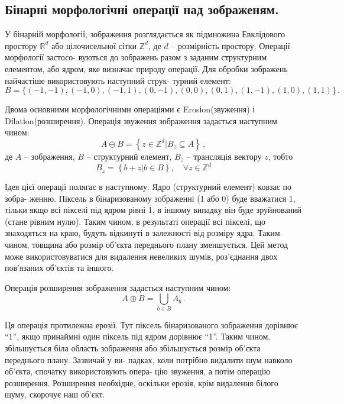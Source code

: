 \subsection{Бінарні морфологічні операції над зображеням.}

У бінарній морфології, зображення розглядається як підмножина Евклідового простору \(\mathbb{R}^d\) або цілочисельної сітки \(\mathbb{Z}^d\), де \(d\) -- розмірність простору. Операції морфології застосо- вуються до зображень разом з заданим структурним елементом, або ядром, яке визначає природу операції. Для обробки зображень найчастіше використовують наступний струк- турний елемент:
\begin{equation*}
B = \{ (-1, -1), (-1, 0), (-1, 1), (0, -1), (0, 0), (0, 1), (1, -1), (1, 0), (1, 1)\}\,.
\end{equation*}

Двома основними морфологічними операціями є Erosіon(звуження) і Dіlatіon(розширення). Операція звуження зображення задається наступним чином:
\begin{equation*}
A \ominus B = \left\{ z \in \mathbb{Z}^d | B_z \subseteq A \right\}\,,
\end{equation*}
де \(A\) -- зображення, \(B\) -- структурний елемент, \(B_z\) -- трансляція вектору \(z\), тобто
\begin{equation*}
B_z = \left\{ b + z | b \in B \right\}, \quad \forall z \in \mathbb{Z}^d
\end{equation*}

Ідея цієї операції полягає в наступному. Ядро (структурний елемент) ковзає по зобра- женню. Піксель в бінаризованому зображенні (1 або 0) буде вважатися 1, тільки якщо всі пікселі під ядром рівні 1, в іншому випадку він буде зруйнований (стане рівним нулю). Таким чином, в результаті операції всі пікселі, що знаходяться на краю, будуть відкинуті в залежності від розміру ядра. Таким чином, товщина або розмір об'єкта переднього плану зменшується. Цей метод може використовуватися для видалення невеликих шумів, роз’єднання двох пов'язаних об'єктів та іншого.

Операція розширення зображення задається наступним чином:
\begin{equation*}
A  \oplus B = \bigcup_{b\in B} A_b\,.
\end{equation*}

Ця операція протилежна ерозії. Тут піксель бінаризованого зображення  дорівнює \enquote{1}, якщо принаймні один піксель під ядром дорівнює \enquote{1}. Таким чином, збільшується біла область зображення або збільшується розмір об'єкта переднього плану. Зазвичай у ви- падках, коли потрібно видалити шум навколо об’єкта, спочатку використовують опера- цію звуження, а потім операцію розширення. Розширення необхідне, оскільки ерозія, крім видалення білого шуму, скорочує наш об'єкт. 


